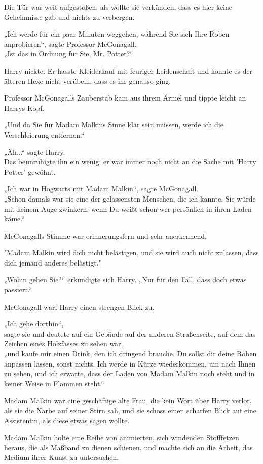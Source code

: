 {Die Tür war weit aufgestoßen, als wollte sie verkünden, dass es hier keine Geheimnisse gab und nichts zu verbergen.

„Ich werde für ein paar Minuten weggehen, während Sie sich Ihre Roben anprobieren“, sagte Professor McGonagall.\\ „Ist das in Ordnung für Sie, Mr. Potter?“

Harry nickte. Er hasste Kleiderkauf mit feuriger Leidenschaft und konnte es der älteren Hexe nicht verübeln, dass es ihr genauso ging.

Professor McGonagalls Zauberstab kam aus ihrem Ärmel und tippte leicht an Harrys Kopf.

„Und da Sie für Madam Malkins Sinne klar sein müssen, werde ich die Verschleierung entfernen.“

„Äh...“ sagte Harry.\\ Das beunruhigte ihn ein wenig; er war immer noch nicht an die Sache mit 'Harry Potter' gewöhnt.

„Ich war in Hogwarts mit Madam Malkin“, sagte McGonagall.\\ „Schon damals war sie eine der gelassensten Menschen, die ich kannte. Sie würde mit keinem Auge zwinkern, wenn Du-weißt-schon-wer persönlich in ihren Laden käme.“

McGonagalls Stimme war erinnerungsfern und sehr anerkennend.

"Madam Malkin wird dich nicht belästigen, und sie wird auch nicht zulassen, dass dich jemand anderes belästigt."

„Wohin gehen Sie?“ erkundigte sich Harry. „Nur für den Fall, dass doch etwas passiert.“

McGonagall warf Harry einen strengen Blick zu.

„Ich gehe dorthin“,\\ sagte sie und deutete auf ein Gebäude auf der anderen Straßenseite, auf dem das Zeichen eines Holzfasses zu sehen war,\\ „und kaufe mir einen Drink, den ich dringend brauche. Du sollst dir deine Roben anpassen lassen, sonst nichts. Ich werde in Kürze wiederkommen, um nach Ihnen zu sehen, und ich erwarte, dass der Laden von Madam Malkin noch steht und in keiner Weise in Flammen steht.“

Madam Malkin war eine geschäftige alte Frau, die kein Wort über Harry verlor, als sie die Narbe auf seiner Stirn sah, und sie schoss einen scharfen Blick auf eine Assistentin, als diese etwas sagen wollte.

Madam Malkin holte eine Reihe von animierten, sich windenden Stofffetzen heraus, die als Maßband zu dienen schienen, und machte sich an die Arbeit, das Medium ihrer Kunst zu untersuchen.

}
